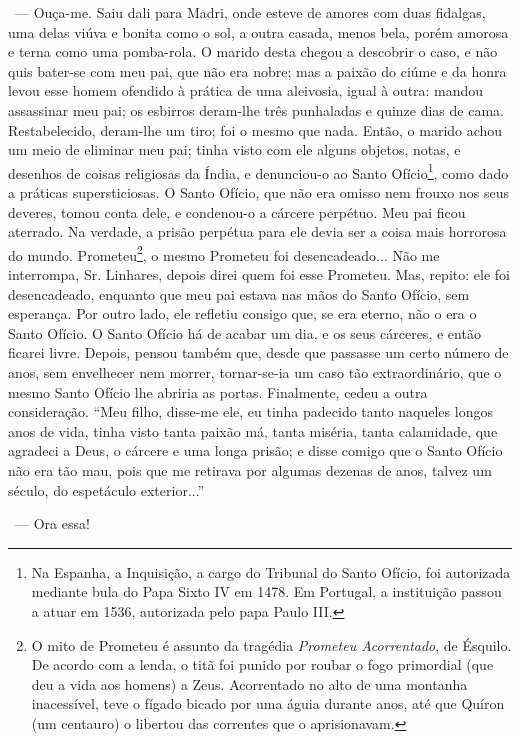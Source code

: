 ~--- Ouça-me. Saiu dali para Madri, onde esteve de amores com duas
fidalgas, uma delas viúva e bonita como o sol, a outra casada, menos
bela, porém amorosa e terna como uma pomba-rola. O marido desta chegou a
descobrir o caso, e não quis bater-se com meu pai, que não era nobre;
mas a paixão do ciúme e da honra levou esse homem ofendido à prática de
uma aleivosia, igual à outra: mandou assassinar meu pai; os esbirros
deram-lhe três punhaladas e quinze dias de cama. Restabelecido,
deram-lhe um tiro; foi o mesmo que nada. Então, o marido achou um meio
de eliminar meu pai; tinha visto com ele alguns objetos, notas, e
desenhos de coisas religiosas da Índia, e denunciou-o ao Santo
Ofício\footnote{Na Espanha, a Inquisição, a cargo do Tribunal do Santo
  Ofício, foi autorizada mediante bula do Papa Sixto IV em 1478. Em
  Portugal, a instituição passou a atuar em 1536, autorizada pelo papa
  Paulo III.}, como dado a práticas supersticiosas. O Santo Ofício, que
não era omisso nem frouxo nos seus deveres, tomou conta dele, e
condenou-o a cárcere perpétuo. Meu pai ficou aterrado. Na verdade, a
prisão perpétua para ele devia ser a coisa mais horrorosa do mundo.
Prometeu\footnote{O mito de Prometeu é assunto da tragédia
  \emph{Prometeu Acorrentado}, de Ésquilo. De acordo com a lenda, o titã
  foi punido por roubar o fogo primordial (que deu a vida aos homens) a
  Zeus. Acorrentado no alto de uma montanha inacessível, teve o fígado
  bicado por uma águia durante anos, até que Quíron (um centauro) o
  libertou das correntes que o aprisionavam.}, o mesmo Prometeu foi
desencadeado... Não me interrompa, Sr. Linhares, depois direi quem foi
esse Prometeu. Mas, repito: ele foi desencadeado, enquanto que meu pai
estava nas mãos do Santo Ofício, sem esperança. Por outro lado, ele
refletiu consigo que, se era eterno, não o era o Santo Ofício. O Santo
Ofício há de acabar um dia, e os seus cárceres, e então ficarei livre.
Depois, pensou também que, desde que passasse um certo número de anos,
sem envelhecer nem morrer, tornar-se-ia um caso tão extraordinário, que
o mesmo Santo Ofício lhe abriria as portas. Finalmente, cedeu a outra
consideração. ``Meu filho, disse-me ele, eu tinha padecido tanto
naqueles longos anos de vida, tinha visto tanta paixão má, tanta
miséria, tanta calamidade, que agradeci a Deus, o cárcere e uma longa
prisão; e disse comigo que o Santo Ofício não era tão mau, pois que me
retirava por algumas dezenas de anos, talvez um século, do espetáculo
exterior...''

~--- Ora essa!


